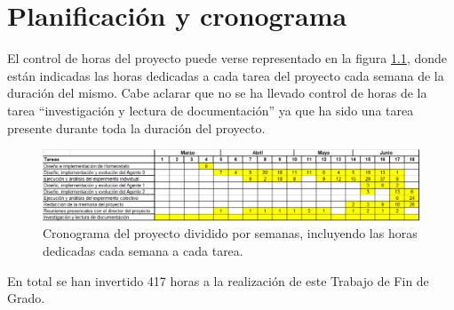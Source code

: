 \chapter{Planificación y cronograma}\label{ch:anexo5}
El control de horas del proyecto puede verse representado en la figura \ref{fig:figuraCrono}, donde están indicadas las horas dedicadas a cada tarea del proyecto cada semana de la duración del mismo. Cabe aclarar que no se ha llevado control de horas de la tarea
``investigación y lectura de documentación'' ya que ha sido una tarea presente durante toda la duración del proyecto.
\begin{figure}[H]
  \centering
  \includegraphics[width=1.0\textwidth]{Imagenes/Cronograma}
	\caption{Cronograma del proyecto dividido por semanas, incluyendo las horas dedicadas cada semana a cada tarea.}
	\label{fig:figuraCrono}
\end{figure}

En total se han invertido 417 horas a la realización de este Trabajo de Fin de Grado.
